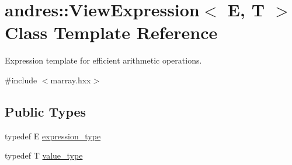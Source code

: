 \hypertarget{classandres_1_1ViewExpression}{}\section{andres\+:\+:View\+Expression$<$ E, T $>$ Class Template Reference}
\label{classandres_1_1ViewExpression}


Expression template for efficient arithmetic operations.  




{\ttfamily \#include $<$marray.\+hxx$>$}

\subsection*{Public Types}
\begin{DoxyCompactItemize}
\item 
typedef E \hyperlink{classandres_1_1ViewExpression_a0b26c0956d2167c6c07ba2841066d450}{expression\+\_\+type}
\item 
typedef T \hyperlink{classandres_1_1ViewExpression_aad128b08207a68e92797aa2c7342feff}{value\+\_\+type}
\end{DoxyCompactItemize}
